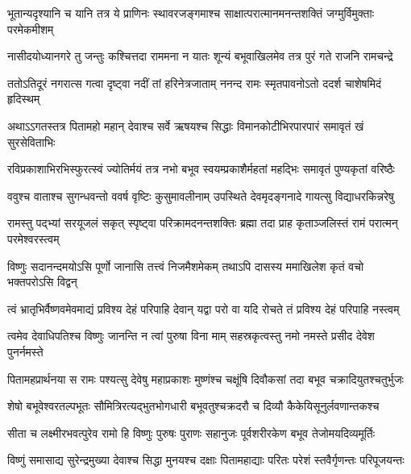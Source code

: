 \fourlineindentedshloka
{भूतान्यदृश्यानि च यानि तत्र}
{ये प्राणिनः स्थावरजङ्गमाश्च}
{साक्षात्परात्मानमनन्तशक्तिं}
{जग्मुर्विमुक्ताः परमेकमीशम्} %

\fourlineindentedshloka
{नासीदयोध्यानगरे तु जन्तुः}
{कश्चित्तदा राममना न यातः}
{शून्यं बभूवाखिलमेव तत्र}
{पुरं गते राजनि रामचन्द्रे} %

\fourlineindentedshloka
{ततोऽतिदूरं नगरात्स गत्वा}
{दृष्ट्वा नदीं तां हरिनेत्रजाताम्}
{ननन्द रामः स्मृतपावनोऽतो}
{ददर्श चाशेषमिदं हृदिस्थम्} %

\fourlineindentedshloka
{अथाऽऽगतस्तत्र पितामहो महान्}
{देवाश्च सर्वे ऋषयश्च सिद्धाः}
{विमानकोटीभिरपारपारं}
{समावृतं खं सुरसेविताभिः} %

\fourlineindentedshloka
{रविप्रकाशाभिरभिस्फुरत्स्वं}
{ज्योतिर्मयं तत्र नभो बभूव}
{स्वयम्प्रकाशैर्महतां महद्भिः}
{समावृतं पुण्यकृतां वरिष्ठैः} %

\fourlineindentedshloka
{ववुश्च वाताश्च सुगन्धवन्तो}
{ववर्ष वृष्टिः कुसुमावलीनाम्}
{उपस्थिते देवमृदङ्गनादे}
{गायत्सु विद्याधरकिन्नरेषु} %

\fourlineindentedshloka
{रामस्तु पद्भ्यां सरयूजलं सकृत्}
{स्पृष्ट्वा परिक्रामदनन्तशक्तिः}
{ब्रह्मा तदा प्राह कृताञ्जलिस्तं}
{रामं परात्मन् परमेश्वरस्त्वम्} %

\fourlineindentedshloka
{विष्णुः सदानन्दमयोऽसि पूर्णो}
{जानासि तत्त्वं निजमैशमेकम्}
{तथाऽपि दासस्य ममाखिलेश}
{कृतं वचो भक्तपरोऽसि विद्वन्} %

\fourlineindentedshloka
{त्वं भ्रातृभिर्वैष्णवमेवमाद्यं}
{प्रविश्य देहं परिपाहि देवान्}
{यद्वा परो वा यदि रोचते तं}
{प्रविश्य देहं परिपाहि नस्त्वम्} %

\fourlineindentedshloka
{त्वमेव देवाधिपतिश्च विष्णुः}
{जानन्ति न त्वां पुरुषा विना माम्}
{सहस्रकृत्वस्तु नमो नमस्ते}
{प्रसीद देवेश पुनर्नमस्ते} %

\fourlineindentedshloka
{पितामहप्रार्थनया स रामः}
{पश्यत्सु देवेषु महाप्रकाशः}
{मुष्णंश्च चक्षूंषि दिवौकसां तदा}
{बभूव चक्रादियुतश्चतुर्भुजः} %

\fourlineindentedshloka
{शेषो बभूवेश्वरतल्पभूतः}
{सौमित्रिरत्यद्भुतभोगधारी}
{बभूवतुश्चक्रदरौ च दिव्यौ}
{कैकेयिसूनुर्लवणान्तकश्च} %

\fourlineindentedshloka
{सीता च लक्ष्मीरभवत्पुरेव}
{रामो हि विष्णुः पुरुषः पुराणः}
{सहानुजः पूर्वशरीरकेण}
{बभूव तेजोमयदिव्यमूर्तिः} %

\fourlineindentedshloka
{विष्णुं समासाद्य सुरेन्द्रमुख्या}
{देवाश्च सिद्धा मुनयश्च दक्षाः}
{पितामहाद्याः परितः परेशं}
{स्तवैर्गृणन्तः परिपूजयन्तः} %

